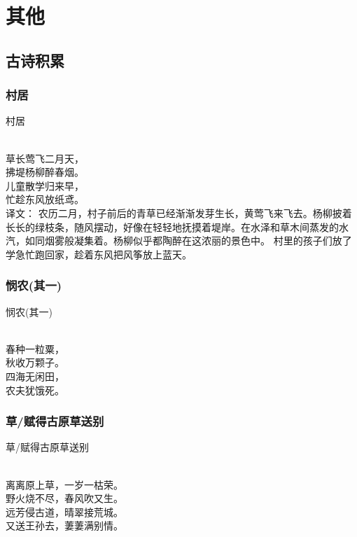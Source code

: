 \chapter{其他}
\section{古诗积累}
\subsection{村居}

	\noindent 村居
	
	  \\
	
	\noindent 草长莺飞二月天，\\拂堤杨柳醉春烟。\\
	儿童散学归来早，\\忙趁东风放纸鸢。\\


译文：
农历二月，村子前后的青草已经渐渐发芽生长，黄莺飞来飞去。杨柳披着长长的绿枝条，随风摆动，好像在轻轻地抚摸着堤岸。在水泽和草木间蒸发的水汽，如同烟雾般凝集着。杨柳似乎都陶醉在这浓丽的景色中。
村里的孩子们放了学急忙跑回家，趁着东风把风筝放上蓝天。

\subsection{悯农(其一)}

\noindent 悯农(其一)

  \\

\noindent 春种一粒粟，\\秋收万颗子。\\
四海无闲田，\\农夫犹饿死。

\subsection{草/赋得古原草送别}

\noindent 草/赋得古原草送别

  \\

\noindent 离离原上草，一岁一枯荣。\\
野火烧不尽，春风吹又生。\\

\noindent 远芳侵古道，晴翠接荒城。\\
又送王孙去，萋萋满别情。\\

